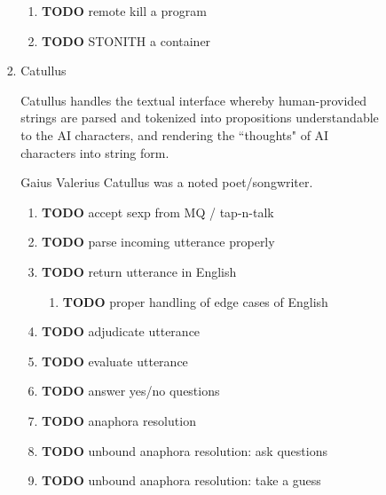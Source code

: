 \documentclass[11pt]{article}
\begin{document}
\begin{enumerate}
\begin{enumerate}
\begin{enumerate}
\begin{enumerate}
\begin{enumerate}
\item {\bfseries\sffamily TODO} remote kill a program
\label{sec-5-4-1-4-3-4-10}

\item {\bfseries\sffamily TODO} STONITH a container
\label{sec-5-4-1-4-3-4-11}
\end{enumerate}
\item Catullus
\label{sec-5-4-1-4-3-5}

Catullus handles the textual interface whereby human-provided strings
are parsed and tokenized into propositions understandable to the AI
characters, and rendering the “thoughts" of AI characters into
string form.

Gaius Valerius Catullus was a noted poet/songwriter.

\begin{enumerate}
\item {\bfseries\sffamily TODO} accept sexp from MQ / tap-n-talk
\label{sec-5-4-1-4-3-5-1}

\item {\bfseries\sffamily TODO} parse incoming utterance properly
\label{sec-5-4-1-4-3-5-2}

\item {\bfseries\sffamily TODO} return utterance in English
\label{sec-5-4-1-4-3-5-3}

\begin{enumerate}
\item {\bfseries\sffamily TODO} proper handling of edge cases of English
\label{sec-5-4-1-4-3-5-3-1}
\end{enumerate}
\item {\bfseries\sffamily TODO} adjudicate utterance
\label{sec-5-4-1-4-3-5-4}

\item {\bfseries\sffamily TODO} evaluate utterance
\label{sec-5-4-1-4-3-5-5}

\item {\bfseries\sffamily TODO} answer yes/no questions
\label{sec-5-4-1-4-3-5-6}

\item {\bfseries\sffamily TODO} anaphora resolution
\label{sec-5-4-1-4-3-5-7}

\item {\bfseries\sffamily TODO} unbound anaphora resolution: ask questions
\label{sec-5-4-1-4-3-5-8}

\item {\bfseries\sffamily TODO} unbound anaphora resolution: take a guess
\label{sec-5-4-1-4-3-5-9}


\end{enumerate}
\end{enumerate}
\end{enumerate}
\end{enumerate}
\end{enumerate}
\end{document}
